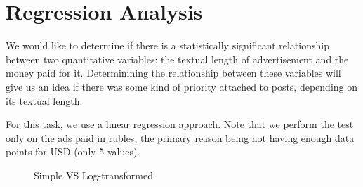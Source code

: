 \documentclass[12pt]{article}
\theoremstyle{definition}
\begin{document}

\section*{\centering Regression Analysis}

We would like to determine if there is a statistically significant relationship
between two quantitative variables: the textual length of advertisement and the
money paid for it. Determinining the relationship between these variables will
give us an idea if there was some kind of priority attached to posts, depending
on its textual length.

\bigskip

For this task, we use a linear regression approach. Note that we perform the
test only on the ads paid in rubles, the primary reason being not having enough
data points for USD (only 5 values).

\begin{figure}[H]
  \centering
  \hfill
  \caption{Simple VS Log-transformed}
  \label{fig:example}
\end{figure}
\end{document}
